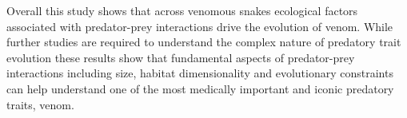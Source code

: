 Overall this study shows that across venomous snakes ecological factors associated with predator-prey interactions drive the evolution of venom. While further studies are required to understand the complex nature of predatory trait evolution these results show that fundamental aspects of predator-prey interactions including size, habitat dimensionality and evolutionary constraints can help understand one of the most medically important and iconic predatory traits, venom.






